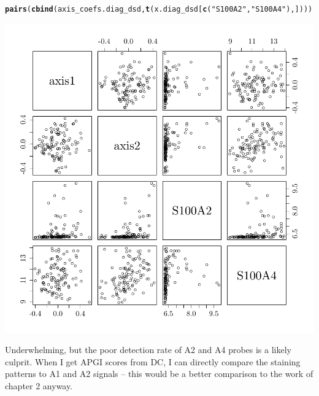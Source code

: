 \documentclass{article}\usepackage[]{graphicx}\usepackage[]{color}
\makeatletter
\def\maxwidth{ %
  \ifdim\Gin@nat@width>\linewidth
    \linewidth
  \else
    \Gin@nat@width
  \fi
}
\newcommand{\hlstr}[1]{\textcolor[rgb]{0.192,0.494,0.8}{#1}}%
\newcommand{\hlstd}[1]{\textcolor[rgb]{0.345,0.345,0.345}{#1}}%
\newcommand{\hlkwd}[1]{\textcolor[rgb]{0.737,0.353,0.396}{\textbf{#1}}}%
\newenvironment{kframe}{%
 \def\at@end@of@kframe{}%
 \ifinner\ifhmode%
  \def\at@end@of@kframe{\end{minipage}}%
  \begin{minipage}{\columnwidth}%
 \fi\fi%
 \def\FrameCommand##1{\hskip\@totalleftmargin \hskip-\fboxsep
 \colorbox{shadecolor}{##1}\hskip-\fboxsep
     \hskip-\linewidth \hskip-\@totalleftmargin \hskip\columnwidth}%
 \MakeFramed {\advance\hsize-\width
   \@totalleftmargin\z@ \linewidth\hsize
   \@setminipage}}%
 {\par\unskip\endMakeFramed%
 \at@end@of@kframe}
\newenvironment{knitrout}{}{} %
\makeatother
\begin{document}
\begin{knitrout}
\color{fgcolor}\begin{kframe}
\begin{alltt}
\hlkwd{pairs}\hlstd{(}\hlkwd{cbind}\hlstd{(axis_coefs.diag_dsd,} \hlkwd{t}\hlstd{(x.diag_dsd[}\hlkwd{c}\hlstd{(}\hlstr{"S100A2"}\hlstd{,} \hlstr{"S100A4"}\hlstd{),])))}
\end{alltt}
\end{kframe}

{\centering \includegraphics[width=\maxwidth]{figure/s100s-vs-a2-1} 

}



\end{knitrout}
Underwhelming, but the poor detection rate of A2 and A4 probes is a likely culprit.  When I get APGI scores from DC, I can directly compare the staining patterns to A1 and A2 signals -- this would be a better comparison to the work of chapter 2 anyway.


\end{document}
